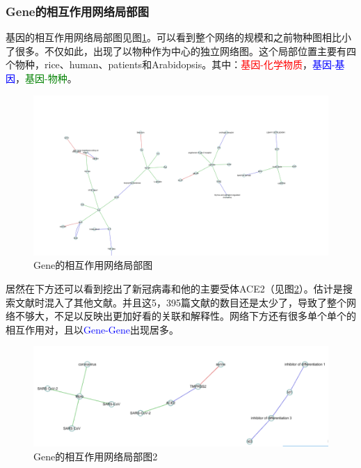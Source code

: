 \documentclass[12pt]{article}
\begin{document}
\subsubsection{Gene的相互作用网络局部图}
基因的相互作用网络局部图见图\ref{mmmss}。可以看到整个网络的规模和之前物种图相比小了很多。不仅如此，出现了以物种作为中心的独立网络图。这个局部位置主要有四个物种，rice、human、patients和Arabidopsis。其中：\textcolor{red}{基因-化学物质}，\textcolor{blue}{基因-基因}，\textcolor{green}{基因-物种}。
\begin{figure}[H]
  \centering
  \includegraphics[scale=0.10]{./picture/Gene.png} %
  \caption{Gene的相互作用网络局部图} %
  \label{mmmss} %
\end{figure}
居然在下方还可以看到挖出了新冠病毒和他的主要受体ACE2（见图\ref{gene2}）。估计是搜索文献时混入了其他文献。并且这5，395篇文献的数目还是太少了，导致了整个网络不够大，不足以反映出更加好看的关联和解释性。网络下方还有很多单个单个的相互作用对，且以\textcolor{blue}{Gene-Gene}出现居多。


\begin{figure}[H]
  \centering
  \includegraphics[scale=0.6]{./picture/Gene2.png} %
  \caption{Gene的相互作用网络局部图2} %
  \label{gene2} %
\end{figure}
\end{document}
